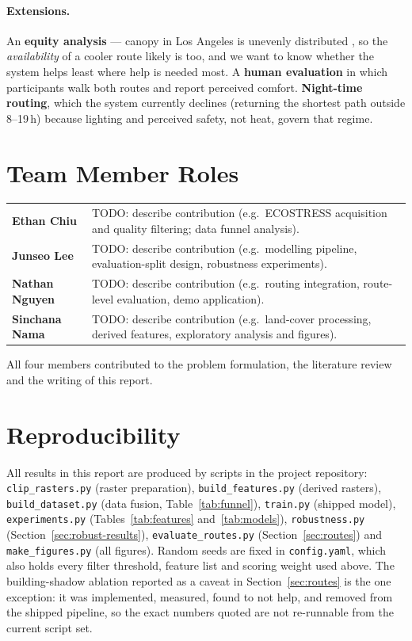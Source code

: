 \documentclass[10pt]{article}   %
\begin{document}
\paragraph{Extensions.}
An \textbf{equity analysis} --- canopy in Los Angeles is unevenly distributed
\citep{hoffman2020redlining}, so the \emph{availability} of a cooler route likely is too, and
we want to know whether the system helps least where help is needed most. A \textbf{human
evaluation} in which participants walk both routes and report perceived comfort.
\textbf{Night-time routing}, which the system currently declines (returning the shortest
path outside 8--19\,h) because lighting and perceived safety, not heat, govern that regime.

\section*{Team Member Roles}
\small
\begin{tabular}{@{}p{}p{}@{}}
\toprule
\textbf{Ethan Chiu} & TODO: describe contribution (e.g.\ ECOSTRESS acquisition and quality
filtering; data funnel analysis). \\
\textbf{Junseo Lee} & TODO: describe contribution (e.g.\ modelling pipeline, evaluation-split
design, robustness experiments). \\
\textbf{Nathan Nguyen} & TODO: describe contribution (e.g.\ routing integration, route-level
evaluation, demo application). \\
\textbf{Sinchana Nama} & TODO: describe contribution (e.g.\ land-cover processing, derived
features, exploratory analysis and figures). \\
\bottomrule
\end{tabular}
\normalsize

\medskip
\noindent All four members contributed to the problem formulation, the literature review and
the writing of this report.

\section*{Reproducibility}
All results in this report are produced by scripts in the project repository:
\texttt{clip\_rasters.py} (raster preparation), \texttt{build\_features.py} (derived rasters),
\texttt{build\_dataset.py} (data fusion, Table~\ref{tab:funnel}), \texttt{train.py} (shipped
model), \texttt{experiments.py} (Tables~\ref{tab:features} and~\ref{tab:models}),
\texttt{robustness.py} (Section~\ref{sec:robust-results}), \texttt{evaluate\_routes.py}
(Section~\ref{sec:routes}) and \texttt{make\_figures.py} (all figures). Random seeds are
fixed in \texttt{config.yaml}, which also holds every filter threshold, feature list and
scoring weight used above. The building-shadow ablation reported as a caveat in
Section~\ref{sec:routes} is the one exception: it was implemented, measured, found to not
help, and removed from the shipped pipeline, so the exact numbers quoted are not
re-runnable from the current script set.



\end{document}
